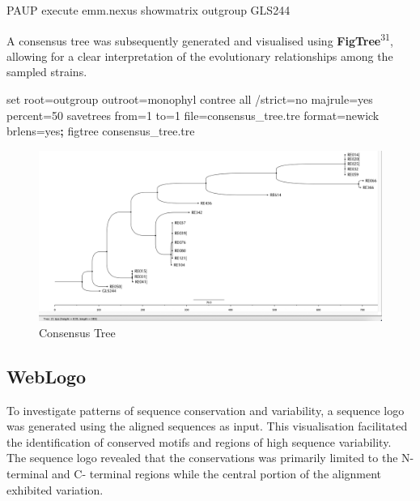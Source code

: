 \documentclass[
]{article}
\newenvironment{Shaded}{\begin{snugshade}}{\end{snugshade}}
\newcommand{\BuiltInTok}[1]{#1}
\newcommand{\ExtensionTok}[1]{#1}
\newcommand{\KeywordTok}[1]{\textcolor[rgb]{0.13,0.29,0.53}{\textbf{#1}}}
\newcommand{\NormalTok}[1]{#1}
\begin{document}
\begin{Shaded}
\begin{Highlighting}[]
\ExtensionTok{PAUP}
\ExtensionTok{execute}\NormalTok{ emm.nexus}
\ExtensionTok{showmatrix}
\ExtensionTok{outgroup}\NormalTok{  GLS244}
\end{Highlighting}
\end{Shaded}

A consensus tree was subsequently generated and visualised using
\textbf{FigTree}\textsuperscript{31}, allowing for a clear
interpretation of the evolutionary relationships among the sampled
strains.

\begin{Shaded}
\begin{Highlighting}[]
\BuiltInTok{set}\NormalTok{ root=outgroup outroot=monophyl}
\ExtensionTok{contree}\NormalTok{ all /strict=no majrule=yes percent=50}
\ExtensionTok{savetrees}\NormalTok{ from=1 to=1 file=consensus\_tree.tre format=newick brlens=yes}\KeywordTok{;}
\ExtensionTok{figtree}\NormalTok{ consensus\_tree.tre}
\end{Highlighting}
\end{Shaded}

\begin{figure}

{\centering \includegraphics[width=1\linewidth]{Images/FigTree_Consensus_Tree} 

}

\caption{ Consensus Tree}\label{fig:unnamed-chunk-40}
\end{figure}

\newpage

\subsection{WebLogo}\label{weblogo}

To investigate patterns of sequence conservation and variability, a
sequence logo was generated using the aligned sequences as input. This
visualisation facilitated the identification of conserved motifs and
regions of high sequence variability. The sequence logo revealed that
the conservations was primarily limited to the N-terminal and C-
terminal regions while the central portion of the alignment exhibited
variation.
\end{document}
